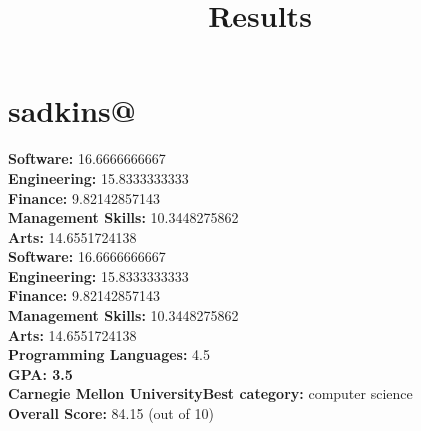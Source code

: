 \documentclass{article}
\title{Results}
\begin{document}
\section{sadkins@}
\textbf{Software:} 16.6666666667\\
\textbf{Engineering:} 15.8333333333\\
\textbf{Finance:} 9.82142857143\\
\textbf{Management Skills:} 10.3448275862\\
\textbf{Arts:} 14.6551724138\\
\textbf{Software:} 16.6666666667\\
\textbf{Engineering:} 15.8333333333\\
\textbf{Finance:} 9.82142857143\\
\textbf{Management Skills:} 10.3448275862\\
\textbf{Arts:} 14.6551724138\\
\textbf{Programming Languages:} 4.5\\
\textbf{GPA: 3.5}\\
\textbf{Carnegie Mellon University}\textbf{Best category: } computer science\\
\textbf{Overall Score: }84.15 (out of 10)
\end{document}
